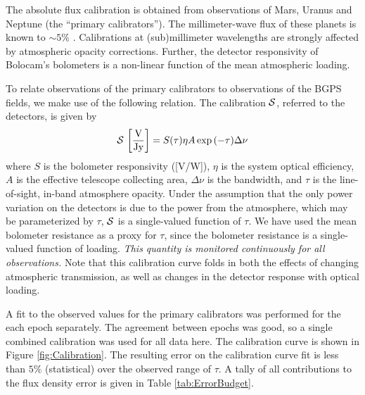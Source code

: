 \documentclass[12pt,preprint]{aastex}
\newcommand{\Check}{{\bf ???}}
\begin{document}
The absolute flux calibration is obtained from observations of Mars,
Uranus and Neptune (the ``primary calibrators'').  The millimeter-wave
flux of these planets is known to $\sim 5\%$
\citep{orton86,griffin93}.  Calibrations at (sub)millimeter
wavelengths are strongly affected by atmospheric opacity corrections.
Further, the detector responsivity of Bolocam's bolometers is a
non-linear function of the mean atmospheric loading.

To relate observations of the primary calibrators to observations of
the BGPS fields, we make use of the following relation.  The
calibration ${\cal S}$, referred to the detectors, is given by
\begin{equation}
\label{eq:Calibration}
{\cal S} \, \left[\mathrm{\frac{V}{Jy}}\right] = 
S(\tau) \eta A \exp{(-\tau)} \Delta\nu
\end{equation}
where $S$ is the bolometer responsivity ([V/W]), $\eta$ is the system
optical efficiency, $A$ is the effective telescope collecting area,
$\Delta \nu$ is the bandwidth, and $\tau$ is the line-of-sight,
in-band atmosphere opacity.  Under the assumption that the only power
variation on the detectors is due to the power from the atmosphere,
which may be parameterized by $\tau$, ${\cal S}$ is a single-valued
function of $\tau$.  We have used the mean bolometer resistance as a
proxy for $\tau$, since the bolometer resistance is a single-valued
function of loading.  {\it This quantity is monitored continuously for
all observations.}  Note that this calibration curve folds in both the
effects of changing atmospheric transmission, as well as changes in
the detector response with optical loading.

%

A fit to the observed values for the primary calibrators was performed
for the each epoch separately.
The agreement between epochs was good, so a single combined
calibration was used for all data here.
The calibration curve is shown in Figure \ref{fig:Calibration}.  The
resulting error on the calibration curve fit is less than 
$5\%$ (statistical) over the observed range of $\tau$.  A tally of all
contributions to the flux density error is given in Table
\ref{tab:ErrorBudget}.
\end{document}
